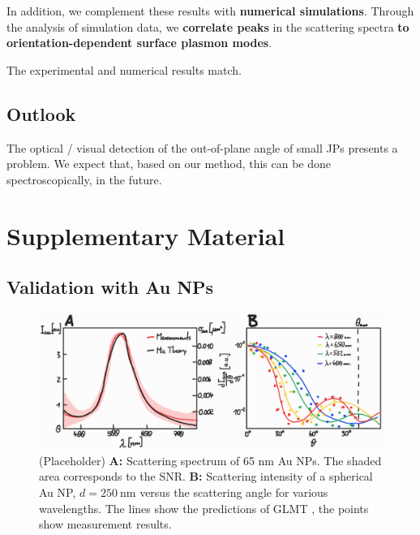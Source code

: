 \documentclass[10pt]{article}
\begin{document}
In addition, we complement these results with \textbf{numerical simulations}. Through the analysis of simulation data, we \textbf{correlate peaks} in the scattering spectra \textbf{to orientation-dependent surface plasmon modes}.

The experimental and numerical results match. 


\subsection*{Outlook}

The optical / visual detection of the out-of-plane angle of small JPs presents a problem. We expect that, based on our method, this can be done spectroscopically, in the future. \\




















\printbibliography














\newpage


\section*{Supplementary Material}

\subsection*{Validation with Au NPs}

\begin{figure}[h!]
    \centering
    \includegraphics[width=\textwidth]{[fig] AuNP (placeholder).jpg}
    \caption{(Placeholder) 
    {\sffamily\bfseries A:} Scattering spectrum of 65 nm Au NPs. The shaded area corresponds to the SNR. 
    {\sffamily\bfseries B:} Scattering intensity of a spherical Au NP, $d=\SI{250}{\nano\meter}$ versus the scattering angle for various wavelengths. The lines show the predictions of GLMT \cite{GouesbetGrehan}, the points show measurement results.
    }
    \label{fig:AuNP}
\end{figure}
\end{document}
